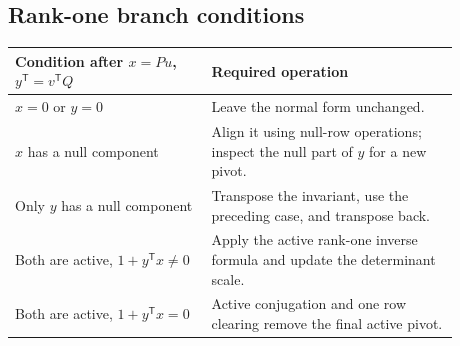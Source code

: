 \documentclass[11pt,letterpaper]{article}
\theoremstyle{definition}\newtheorem{definition}[theorem]{Definition}
\theoremstyle{remark}\newtheorem{remark}[theorem]{Remark}
\newcommand{\trans}{^{\mathsf T}}
\begin{document}
\subsection{Rank-one branch conditions}
\begin{center}
\begin{tabular}{p{0.39\linewidth}p{0.49\linewidth}}
\toprule
Condition after $x=Pu$, $y\trans=v\trans Q$ & Required operation\\
\midrule
$x=0$ or $y=0$ & Leave the normal form unchanged.\\
$x$ has a null component & Align it using null-row operations; inspect the null part of $y$ for a new pivot.\\
Only $y$ has a null component & Transpose the invariant, use the preceding case, and transpose back.\\
Both are active, $1+y\trans x\neq0$ & Apply the active rank-one inverse formula and update the determinant scale.\\
Both are active, $1+y\trans x=0$ & Active conjugation and one row clearing remove the final active pivot.\\
\bottomrule
\end{tabular}
\end{center}

\clearpage
\end{document}
